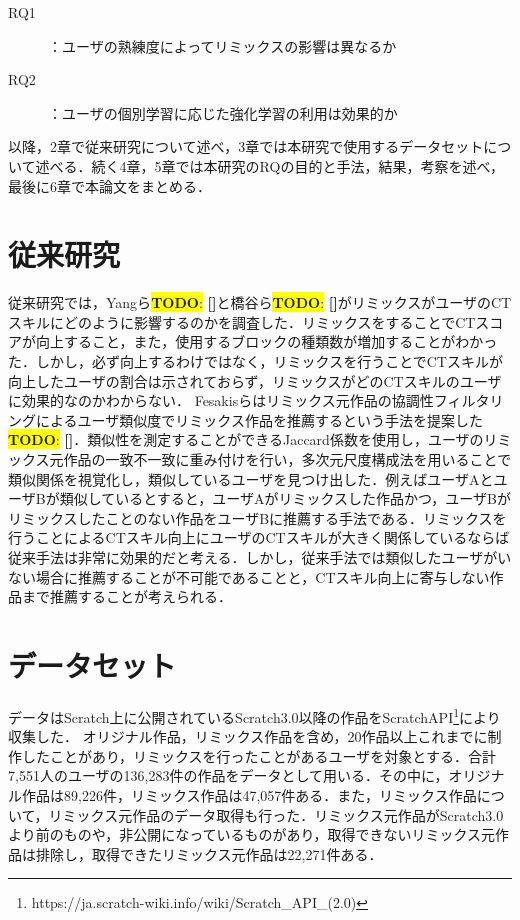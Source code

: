 \documentclass[submit,techrep,noauthor]{ipsj}
\newcommand{\todo}[1]{\colorbox{yellow}{{\bf TODO}:}{\color{red} {\textbf{[#1]}}}}
\begin{document}
\begin{description}
  \item[RQ1]：ユーザの熟練度によってリミックスの影響は異なるか
  \item[RQ2]：ユーザの個別学習に応じた強化学習の利用は効果的か
\end{description}

以降，2章で従来研究について述べ，3章では本研究で使用するデータセットについて述べる．続く4章，5章では本研究のRQの目的と手法，結果，考察を述べ，最後に6章で本論文をまとめる．

\section{従来研究}
従来研究では，Yangら\todo{}と橋谷ら\todo{}がリミックスがユーザのCTスキルにどのように影響するのかを調査した．リミックスをすることでCTスコアが向上すること，また，使用するブロックの種類数が増加することがわかった．しかし，必ず向上するわけではなく，リミックスを行うことでCTスキルが向上したユーザの割合は示されておらず，リミックスがどのCTスキルのユーザに効果的なのかわからない．
Fesakisらはリミックス元作品の協調性フィルタリングによるユーザ類似度でリミックス作品を推薦するという手法を提案した\todo{}．類似性を測定することができるJaccard係数を使用し，ユーザのリミックス元作品の一致不一致に重み付けを行い，多次元尺度構成法を用いることで類似関係を視覚化し，類似しているユーザを見つけ出した．例えばユーザAとユーザBが類似しているとすると，ユーザAがリミックスした作品かつ，ユーザBがリミックスしたことのない作品をユーザBに推薦する手法である．リミックスを行うことによるCTスキル向上にユーザのCTスキルが大きく関係しているならば従来手法は非常に効果的だと考える．しかし，従来手法では類似したユーザがいない場合に推薦することが不可能であることと，CTスキル向上に寄与しない作品まで推薦することが考えられる．


\section{データセット}
データはScratch上に公開されているScratch3.0以降の作品をScratchAPI\footnote{https://ja.scratch-wiki.info/wiki/Scratch\_API\_(2.0)}により収集した．
オリジナル作品，リミックス作品を含め，20作品以上これまでに制作したことがあり，リミックスを行ったことがあるユーザを対象とする．合計7,551人のユーザの136,283件の作品をデータとして用いる．その中に，オリジナル作品は89,226件，リミックス作品は47,057件ある．また，リミックス作品について，リミックス元作品のデータ取得も行った．リミックス元作品がScratch3.0より前のものや，非公開になっているものがあり，取得できないリミックス元作品は排除し，取得できたリミックス元作品は22,271件ある．
\end{document}
